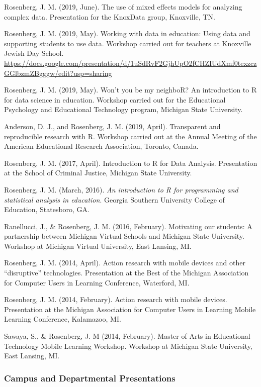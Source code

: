 \documentclass[14,]{article}
\begin{document}
Rosenberg, J. M. (2019, June). The use of mixed effects models for
analyzing complex data. Presentation for the KnoxData group, Knoxville,
TN.

Rosenberg, J. M. (2019, May). Working with data in education: Using data
and supporting students to use data. Workshop carried out for teachers
at Knoxville Jewish Day School.
\url{https://docs.google.com/presentation/d/1uSdRvF2GjhUpO2fCHZIUdXmf0texzczGGlbzmZBgggw/edit?usp=sharing}

Rosenberg, J. M. (2019, May). Won't you be my neighboR? An introduction
to R for data science in education. Workshop carried out for the
Educational Psychology and Educational Technology program, Michigan
State University.

Anderson, D. J., and Rosenberg, J. M. (2019, April). Transparent and
reproducible research with R. Workshop carried out at the Annual Meeting
of the American Educational Research Association, Toronto, Canada.

Rosenberg, J. M. (2017, April). Introduction to R for Data Analysis.
Presentation at the School of Criminal Justice, Michigan State
University.

Rosenberg, J. M. (March, 2016). \emph{An introduction to R for
programming and statistical analysis in education}. Georgia Southern
University College of Education, Statesboro, GA.

Ranellucci, J., \& Rosenberg, J. M. (2016, February). Motivating our
students: A partnership between Michigan Virtual Schools and Michigan
State University. Workshop at Michigan Virtual University, East Lansing,
MI.

Rosenberg, J. M. (2014, April). Action research with mobile devices and
other ``disruptive'' technologies. Presentation at the Best of the
Michigan Association for Computer Users in Learning Conference,
Waterford, MI.

Rosenberg, J. M. (2014, February). Action research with mobile devices.
Presentation at the Michigan Association for Computer Users in Learning
Mobile Learning Conference, Kalamazoo, MI.

Sawaya, S., \& Rosenberg, J. M (2014, February). Master of Arts in
Educational Technology Mobile Learning Workshop. Workshop at Michigan
State University, East Lansing, MI.

\hypertarget{campus-and-departmental-presentations}{%
\subsubsection{Campus and Departmental
Presentations}\label{campus-and-departmental-presentations}}
\end{document}

